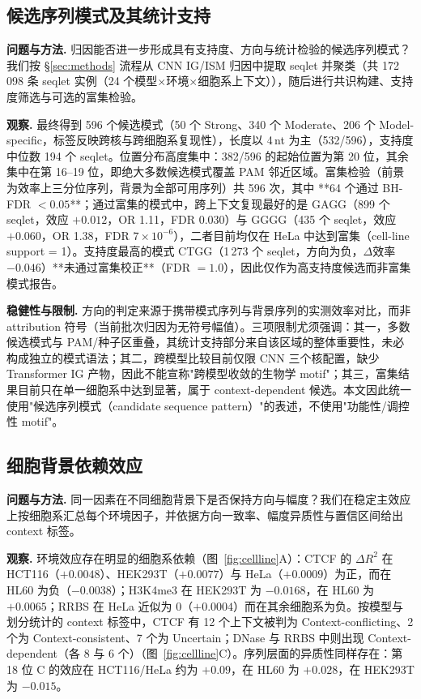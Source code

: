 

\subsection{候选序列模式及其统计支持}
\label{sec:res-motifs}

\textbf{问题与方法.} 归因能否进一步形成具有支持度、方向与统计检验的候选序列模式？我们按 \S\ref{sec:methods} 流程从 CNN IG/ISM 归因中提取 seqlet 并聚类（共 172\,098 条 seqlet 实例（24 个模型$\times$环境$\times$细胞系上下文）），随后进行共识构建、支持度筛选与可选的富集检验。

\textbf{观察.} 最终得到 596 个候选模式（50 个 Strong、340 个 Moderate、206 个 Model-specific，标签反映跨核与跨细胞系复现性），长度以 4\,nt 为主（532/596），支持度中位数 194 个 seqlet。位置分布高度集中：382/596 的起始位置为第 20 位，其余集中在第 16--19 位，即绝大多数候选模式覆盖 PAM 邻近区域。富集检验（前景为效率上三分位序列，背景为全部可用序列）共 596 次，其中 **64 个通过 BH-FDR $<0.05$**；通过富集的模式中，跨上下文复现最好的是 GAGG（899 个 seqlet，效应 $+0.012$，OR 1.11，FDR 0.030）与 GGGG（435 个 seqlet，效应 $+0.060$，OR 1.38，FDR $7\times10^{-6}$），二者目前均仅在 HeLa 中达到富集（cell-line support = 1）。支持度最高的模式 CTGG（1\,273 个 seqlet，方向为负，$\Delta$效率 $-0.046$）**未通过富集校正**（FDR $=1.0$），因此仅作为高支持度候选而非富集模式报告。

\textbf{稳健性与限制.} 方向的判定来源于携带模式序列与背景序列的实测效率对比，而非 attribution 符号（当前批次归因为无符号幅值）。三项限制尤须强调：其一，多数候选模式与 PAM/种子区重叠，其统计支持部分来自该区域的整体重要性，未必构成独立的模式语法；其二，跨模型比较目前仅限 CNN 三个核配置，缺少 Transformer IG 产物，因此不能宣称"跨模型收敛的生物学 motif"；其三，富集结果目前只在单一细胞系中达到显著，属于 context-dependent 候选。本文因此统一使用"候选序列模式（candidate sequence pattern）"的表述，不使用"功能性/调控性 motif"。



\subsection{细胞背景依赖效应}
\label{sec:res-cellline}

\textbf{问题与方法.} 同一因素在不同细胞背景下是否保持方向与幅度？我们在稳定主效应上按细胞系汇总每个环境因子，并依据方向一致率、幅度异质性与置信区间给出 context 标签。

\textbf{观察.} 环境效应存在明显的细胞系依赖（图~\ref{fig:cellline}A）：CTCF 的 $\Delta R^{2}$ 在 HCT116（$+0.0048$）、HEK293T（$+0.0077$）与 HeLa（$+0.0009$）为正，而在 HL60 为负（$-0.0038$）；H3K4me3 在 HEK293T 为 $-0.0168$，在 HL60 为 $+0.0065$；RRBS 在 HeLa 近似为 0（$+0.0004$）而在其余细胞系为负。按模型与划分统计的 context 标签中，CTCF 有 12 个上下文被判为 Context-conflicting、2 个为 Context-consistent、7 个为 Uncertain；DNase 与 RRBS 中则出现 Context-dependent（各 8 与 6 个）（图~\ref{fig:cellline}C）。序列层面的异质性同样存在：第 18 位 C 的效应在 HCT116/HeLa 约为 $+0.09$，在 HL60 为 $+0.028$，在 HEK293T 为 $-0.015$。

